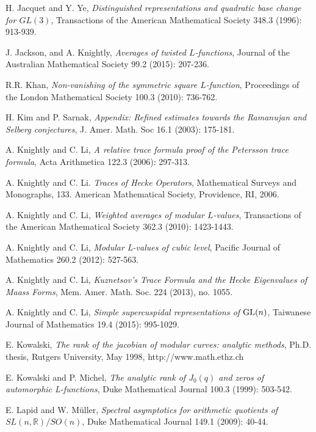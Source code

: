 \documentclass[11pt,reqno]{amsart}
\theoremstyle{definition}
\begin{document}
\begin{thebibliography}{100}
H. Jacquet and Y. Ye, {\it Distinguished representations and quadratic base change for $GL(3)$},
Transactions of the American Mathematical Society 348.3 (1996): 913-939.

J. Jackson, and A. Knightly,
{\it Averages of twisted $L$-functions},
Journal of the Australian Mathematical Society 99.2 (2015): 207-236.

R.R. Khan, {\it Non-vanishing of the symmetric square $L$-function},
Proceedings of the London Mathematical Society 100.3 (2010): 736-762.

H. Kim and P. Sarnak,
{\it Appendix: Refined estimates towards the Ramanujan and Selberg conjectures},
J. Amer. Math. Soc 16.1 (2003): 175-181.


A. Knightly and C. Li,
{\it A relative trace formula proof of the Petersson
trace formula}, Acta Arithmetica 122.3 (2006): 297-313.

A. Knightly and C. Li. {\it Traces of Hecke Operators},
 Mathematical Surveys and Monographs, 133. American Mathematical Society, Providence, RI, 2006.


A. Knightly and C. Li,
{\it Weighted averages of modular $L$-values},
Transactions of the American Mathematical Society 362.3 (2010): 1423-1443.


A. Knightly and C. Li, {\it Modular L-values of cubic level},
Pacific Journal of Mathematics 260.2 (2012): 527-563.

A. Knightly and C. Li,
{\it Kuznetsov's Trace Formula and the Hecke Eigenvalues of Maass Forms},
Mem. Amer. Math. Soc. 224 (2013), no. 1055.



A. Knightly and C. Li, {\it
Simple supercuspidal representations of ${\rm GL}(n)$},
Taiwanese Journal of Mathematics 19.4 (2015): 995-1029.

E. Kowalski, {\it The rank of the jacobian of modular curves: analytic methods},
Ph.D. thesis, Rutgers University, May 1998, http://www.math.ethz.ch

E. Kowalski and P. Michel, {\it The analytic rank of $J_0(q)$ and zeros of automorphic L-functions}, Duke Mathematical Journal 100.3 (1999): 503-542.

E. Lapid and W. M\"{u}ller, {\it Spectral asymptotics for arithmetic quotients of $SL(n,\mathbb R)/SO(n)$}, Duke Mathematical Journal 149.1 (2009): 40-44.


\end{thebibliography}
\end{document}
